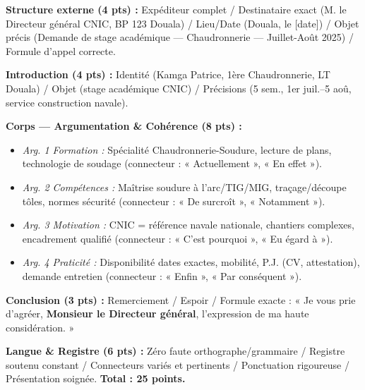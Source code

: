 \documentclass[11pt]{article}
\begin{document}
\begin{corrige}
\textbf{Structure externe (4 pts) :} Expéditeur complet / Destinataire exact (M. le Directeur général CNIC, BP 123 Douala) / Lieu/Date (Douala, le [date]) / Objet précis (Demande de stage académique — Chaudronnerie — Juillet-Août 2025) / Formule d'appel correcte.

\textbf{Introduction (4 pts) :} Identité (Kamga Patrice, 1ère Chaudronnerie, LT Douala) / Objet (stage académique CNIC) / Précisions (5 sem., 1er juil.–5 aoû, service construction navale).

\textbf{Corps — Argumentation \& Cohérence (8 pts) :}
\begin{itemize}
\item \textit{Arg. 1 Formation :} Spécialité Chaudronnerie-Soudure, lecture de plans, technologie de soudage (connecteur : « Actuellement », « En effet »).
\item \textit{Arg. 2 Compétences :} Maîtrise soudure à l'arc/TIG/MIG, traçage/découpe tôles, normes sécurité (connecteur : « De surcroît », « Notamment »).
\item \textit{Arg. 3 Motivation :} CNIC = référence navale nationale, chantiers complexes, encadrement qualifié (connecteur : « C'est pourquoi », « Eu égard à »).
\item \textit{Arg. 4 Praticité :} Disponibilité dates exactes, mobilité, P.J. (CV, attestation), demande entretien (connecteur : « Enfin », « Par conséquent »).
\end{itemize}

\textbf{Conclusion (3 pts) :} Remerciement / Espoir / Formule exacte : « Je vous prie d'agréer, \textbf{Monsieur le Directeur général}, l'expression de ma haute considération. »

\textbf{Langue \& Registre (6 pts) :} Zéro faute orthographe/grammaire / Registre soutenu constant / Connecteurs variés et pertinents / Ponctuation rigoureuse / Présentation soignée.
\textbf{Total : 25 points.}
\end{corrige}
\end{document}

